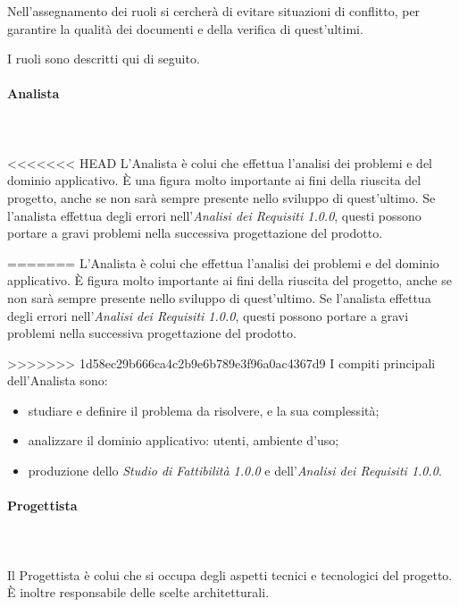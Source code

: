    			Nell'assegnamento dei ruoli si cercherà di evitare situazioni di conflitto, per garantire la qualità dei documenti e della verifica di quest'ultimi.

   			I ruoli sono descritti qui di seguito.
   			\paragraph{Analista} \mbox{}\\ \mbox{}\\
<<<<<<< HEAD
   				L'Analista è colui che effettua l'analisi dei problemi e del dominio applicativo. \`{E} una figura molto importante ai fini della riuscita del progetto, anche se non sarà sempre presente nello sviluppo di quest'ultimo. Se l'analista effettua degli errori nell'\textit{Analisi dei Requisiti 1.0.0}, questi possono portare a gravi problemi nella successiva progettazione del prodotto.
   				
=======
   				L'Analista è colui che effettua l'analisi dei problemi e del dominio applicativo. \`{E} figura molto importante ai fini della riuscita del progetto, anche se non sarà sempre presente nello sviluppo di quest'ultimo. Se l'analista effettua degli errori nell'\textit{Analisi dei Requisiti 1.0.0}, questi possono portare a gravi problemi nella successiva progettazione del prodotto.

>>>>>>> 1d58ec29b666ca4c2b9e6b789e3f96a0ac4367d9
   				I compiti principali dell'Analista sono:
   				\begin{itemize}
   					\item studiare e definire il problema da risolvere, e la sua complessità;
   					\item analizzare il dominio applicativo: utenti, ambiente d'uso;
   					\item produzione dello \textit{Studio di Fattibilità 1.0.0} e  dell'\textit{Analisi dei Requisiti 1.0.0}.
   				\end{itemize}
   			\paragraph{Progettista} \mbox{}\\ \mbox{}\\
   			Il Progettista è colui che si occupa degli aspetti tecnici e tecnologici del progetto. \`{E} inoltre responsabile delle scelte architetturali.

